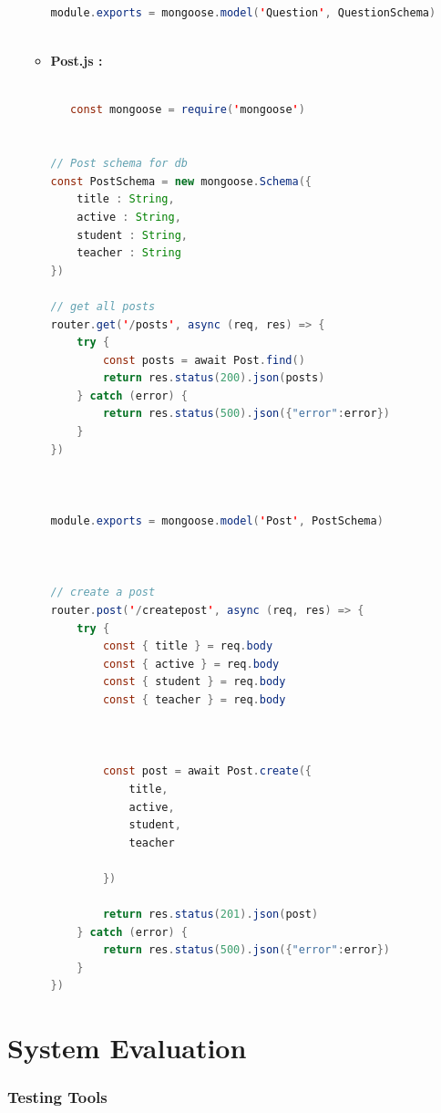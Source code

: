 \begin{itemize}
\begin{itemize}
\begin{lstlisting}[language=Java, caption= Question.js Code Stubs ]
module.exports = mongoose.model('Question', QuestionSchema)
 
 \end{lstlisting}

 

  \item\textbf{Post.js  :}
  
  
   \begin{lstlisting}[language=Java, caption= Post Schema and Get Post Methods ]
   
   const mongoose = require('mongoose')


// Post schema for db
const PostSchema = new mongoose.Schema({
    title : String,
    active : String,
    student : String,
    teacher : String
})

// get all posts 
router.get('/posts', async (req, res) => {
    try {
        const posts = await Post.find()
        return res.status(200).json(posts)
    } catch (error) {
        return res.status(500).json({"error":error})
    }
})



module.exports = mongoose.model('Post', PostSchema)



// create a post
router.post('/createpost', async (req, res) => {
    try {
        const { title } = req.body
        const { active } = req.body        
        const { student } = req.body
        const { teacher } = req.body



        const post = await Post.create({
            title,
            active,
            student,
            teacher

        })

        return res.status(201).json(post)
    } catch (error) {
        return res.status(500).json({"error":error})
    }
})


 \end{lstlisting}


   \end{itemize}
   
  
\end{itemize}


\chapter{System Evaluation}

\subsection{Testing Tools}

